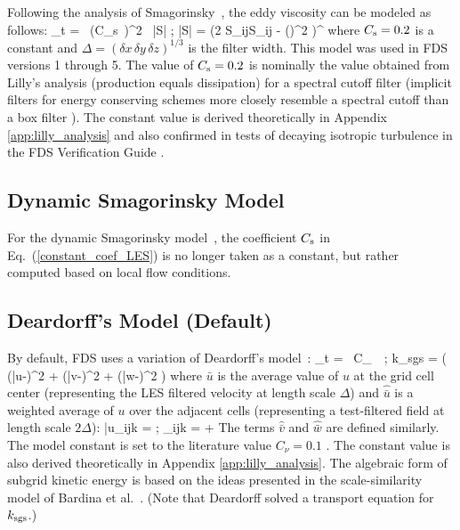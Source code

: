 Following the analysis of Smagorinsky~\cite{Smagorinsky:1}, the eddy viscosity can be modeled as follows:
\be
\mu_t = \rho \, (C_{\rm s}\, \Delta)^2 \, |S| \label{constant_coef_LES} \quad ; \quad |S| = \left(2 S_{ij}S_{ij} -  (\nabla\!\cdot \bu)^2 \right)^\ha
\ee
where $C_{\rm s}=0.2$ is a constant and $\Delta = (\delta x \, \delta y \, \delta z)^{1/3}$ is the filter width. This model was used in FDS versions 1 through 5.  The value of $C_{\rm s}=0.2$ is nominally the value obtained from Lilly's analysis \cite{Lilly:1967} (production equals dissipation) for a spectral cutoff filter (implicit filters for energy conserving schemes more closely resemble a spectral cutoff than a box filter \cite{McDermott:2005b}).  The constant value is derived theoretically in Appendix \ref{app:lilly_analysis} and also confirmed in tests of decaying isotropic turbulence in the FDS Verification Guide \cite{FDS_Verification_Guide}.

\subsection{Dynamic Smagorinsky Model}

For the dynamic Smagorinsky model~\cite{Germano:1,Moin:1991}, the coefficient $C_{\rm s}$ in Eq.~(\ref{constant_coef_LES}) is no longer taken as a constant, but rather computed based on local flow conditions.

\subsection{Deardorff's Model (Default)}
\label{sec:deardorff}

By default, FDS uses a variation of Deardorff's model~\cite{Deardorff:1980}:
\be
  \mu_{\rm t} = \rho \, C_\nu \, \Delta \,  \quad ; \quad
  k_{\rm sgs} = \ha \left( (\bar{u}-)^2 + (\bar{v}-)^2 + (\bar{w}-)^2 \right)  \label{Deardorff_LES}
\ee
where $\bar{u}$ is the average value of $u$ at the grid cell center (representing the LES filtered velocity at length scale $\Delta$) and $\hat{\bar{u}}$ is a weighted average of $u$ over the adjacent cells (representing a test-filtered field at length scale $2\Delta$):
\be
   \bar{u}_{ijk} =  \quad ; \quad {}_{ijk} =  + 
\ee
The terms $\hat{\bar{v}}$ and $\hat{\bar{w}}$ are defined similarly.  The model constant is set to the literature value $C_\nu=0.1$ \cite{Pope:2000}.  The constant value is also derived theoretically in Appendix \ref{app:lilly_analysis}.  The algebraic form of subgrid kinetic energy is based on the ideas presented in the scale-similarity model of Bardina et al.~\cite{Bardina:1980}. (Note that Deardorff \cite{Deardorff:1980} solved a transport equation for $k_{\rm sgs}$.)

